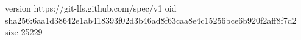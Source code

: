 version https://git-lfs.github.com/spec/v1
oid sha256:6aa1d38642e1ab418393f02d3b46ad8f63caa8e4c15256bce6b920f2aff8f7d2
size 25229
